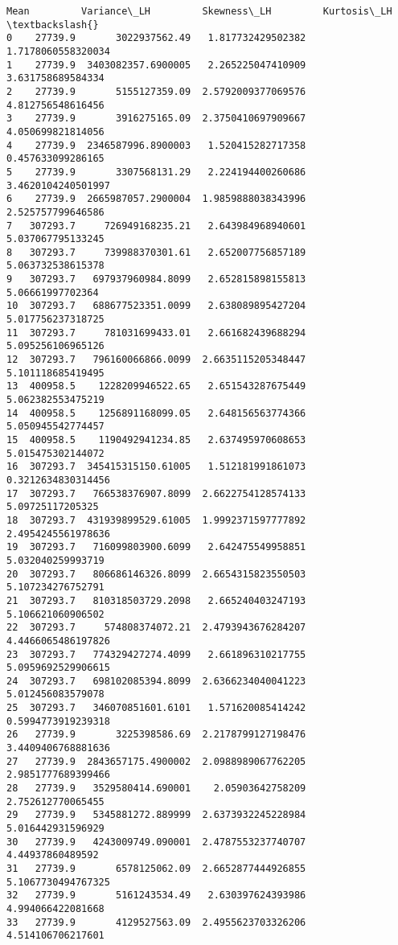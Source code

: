 \documentclass[11pt]{article}
\makeatletter
\newcommand{\boxspacing}{\kern\kvtcb@left@rule\kern\kvtcb@boxsep}
\newcommand{\prompt}[4]{
        \ttfamily\llap{{\color{#2}[#3]:\hspace{3pt}#4}}\vspace{-\baselineskip}
    }
\makeatother
\begin{document}
            \begin{tcolorbox}[breakable, size=fbox, boxrule=.5pt, pad at break*=1mm, opacityfill=0]
\prompt{Out}{outcolor}{273}{\boxspacing}
\begin{Verbatim}[commandchars=\\\{\}]
        Mean         Variance\_LH         Skewness\_LH         Kurtosis\_LH  \textbackslash{}
0    27739.9       3022937562.49   1.817732429502382  1.7178060558320034
1    27739.9  3403082357.6900005   2.265225047410909   3.631758689584334
2    27739.9       5155127359.09  2.5792009377069576   4.812756548616456
3    27739.9       3916275165.09  2.3750410697909667   4.050699821814056
4    27739.9  2346587996.8900003   1.520415282717358   0.457633099286165
5    27739.9       3307568131.29   2.224194400260686  3.4620104240501997
6    27739.9  2665987057.2900004  1.9859888038343996   2.525757799646586
7   307293.7     726949168235.21   2.643984968940601   5.037067795133245
8   307293.7     739988370301.61   2.652007756857189   5.063732538615378
9   307293.7   697937960984.8099   2.652815898155813    5.06661997702364
10  307293.7   688677523351.0099   2.638089895427204   5.017756237318725
11  307293.7     781031699433.01   2.661682439688294   5.095256106965126
12  307293.7   796160066866.0099  2.6635115205348447   5.101118685419495
13  400958.5    1228209946522.65   2.651543287675449   5.062382553475219
14  400958.5    1256891168099.05   2.648156563774366   5.050945542774457
15  400958.5    1190492941234.85   2.637495970608653   5.015475302144072
16  307293.7  345415315150.61005   1.512181991861073  0.3212634830314456
17  307293.7   766538376907.8099  2.6622754128574133    5.09725117205325
18  307293.7  431939899529.61005  1.9992371597777892  2.4954245561978636
19  307293.7   716099803900.6099   2.642475549958851   5.032040259993719
20  307293.7   806686146326.8099  2.6654315823550503   5.107234276752791
21  307293.7   810318503729.2098   2.665240403247193   5.106621060906502
22  307293.7     574808374072.21  2.4793943676284207  4.4466065486197826
23  307293.7   774329427274.4099   2.661896310217755  5.0959692529906615
24  307293.7   698102085394.8099  2.6366234040041223   5.012456083579078
25  307293.7   346070851601.6101   1.571620085414242  0.5994773919239318
26   27739.9       3225398586.69  2.2178799127198476  3.4409406768881636
27   27739.9  2843657175.4900002  2.0988989067762205  2.9851777689399466
28   27739.9   3529580414.690001    2.05903642758209   2.752612770065455
29   27739.9   5345881272.889999  2.6373932245228984   5.016442931596929
30   27739.9   4243009749.090001  2.4787553237740707    4.44937860489592
31   27739.9       6578125062.09  2.6652877444926855  5.1067730494767325
32   27739.9       5161243534.49   2.630397624393986   4.994066422081668
33   27739.9       4129527563.09  2.4955623703326206   4.514106706217601


\end{Verbatim}
\end{tcolorbox}
\end{document}
